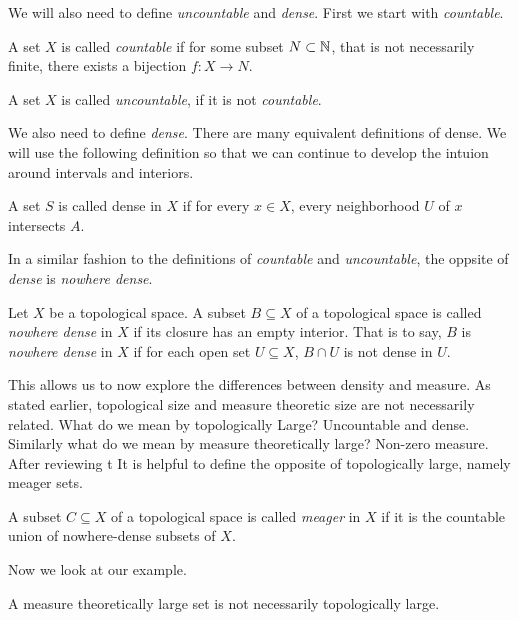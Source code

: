 {%


We will also need to define \textit{uncountable} and \textit{dense}.  First we start with \textit{countable}.

\begin{definition}[Countable]
    A set $X$ is called \textit{countable} if for some  subset $N \subset \mathbb{N}$, that is not necessarily finite, there exists a bijection $f: X \to N$.  
\end{definition}

\begin{definition}[Uncountable]
    A set $X$ is called \textit{uncountable}, if it is not \textit{countable}.
\end{definition}

We also need to define \textit{dense}.  There are many equivalent definitions of dense.  We will use the following definition so that we can continue to develop the intuion around intervals and interiors. 

\begin{definition}[Dense]
    A set $S$ is called dense in $X$ if for every $x \in X$, every neighborhood $U$ of $x$ intersects $A$.  
\end{definition}


In a similar fashion to the definitions of \textit{countable} and \textit{uncountable}, the oppsite of \textit{dense} is \textit{nowhere dense}.

\begin{definition}  Let $X$ be a topological space.  A subset $B \subseteq X$ of a topological space is called \textit{nowhere dense} in $X$ if its closure has an empty interior.  That is to say, $B$ is \textit{nowhere dense} in $X$ if for each open set $U\subseteq X$, $B\cap U$ is not dense in $U$.      
\end{definition}


This allows us to now explore the differences between density and measure.  As stated earlier, topological size and measure theoretic size are not necessarily related.  What do we mean by topologically Large? Uncountable and dense.  Similarly what do we mean by measure theoretically large?  Non-zero measure.  After reviewing t It is helpful to define the opposite of topologically large, namely meager sets.



\begin{definition}[Meager]  A subset $C \subseteq X$ of a topological space is called \textit{meager} in $X$ if it is the countable union of nowhere-dense subsets of $X$.    
\end{definition}
Now we look at our example.  
\begin{example}A measure theoretically large set is not necessarily topologically large.


\end{example}}
